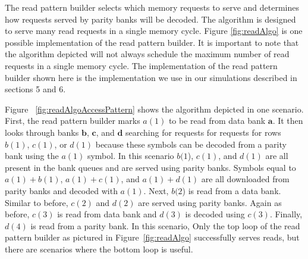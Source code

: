 The read pattern builder selects which memory requests to serve and determines how requests served by parity banks will be decoded. The algorithm is designed to serve many read requests in a single memory cycle. Figure \ref{fig:readAlgo} is one possible implementation of the read pattern builder. It is important to note that the algorithm depicted will not always schedule the maximum number of read requests in a single memory cycle. The implementation of the read pattern builder shown here is the implementation we use in our simulations described in sections 5 and 6. 

Figure ~\ref{fig:readAlgoAccessPattern} shows the algorithm depicted in one scenario. First, the read pattern builder marks $a(1)$ to be read from data bank $\mathbf{a}$. It then looks through banks $\mathbf{b}$, $\mathbf{c}$, and $\mathbf{d}$ searching for requests for requests for rows $b(1)$, $c(1)$, or $d(1)$ because these symbols can be decoded from a parity bank using the $a(1)$ symbol. In this scenario $b(1$), $c(1)$, and $d(1)$ are all present in the bank queues and are served using parity banks. Symbols equal to  $a(1) + b(1)$, $a(1) + c(1)$, and $a(1) + d(1)$ are all downloaded from parity banks and decoded with $a(1)$. Next, $b(2$) is read from a data bank. Similar to before, $c(2)$ and $d(2)$ are served using parity banks. Again as before, $c(3)$ is read from data bank and $d(3)$ is decoded using $c(3)$. Finally, $d(4)$ is read from a parity bank. In this scenario, Only the top loop of the read pattern builder as pictured in Figure~\ref{fig:readAlgo} successfully serves reads, but there are scenarios where the bottom loop is useful. 

